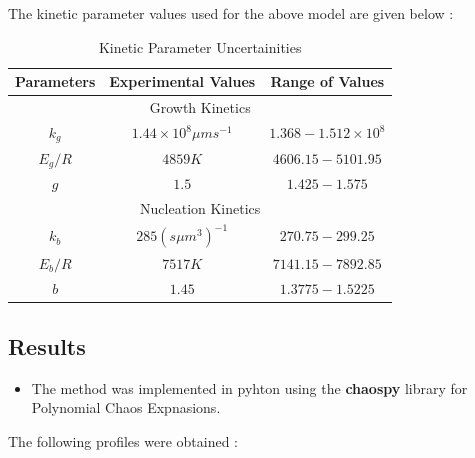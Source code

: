 The kinetic parameter values used for the above model are given below :
\begin{center}
\begin{table}[!h]
\centering
\caption{Kinetic Parameter Uncertainities\cite{hu,shi,paeng}}
\begin{tabular}{|c|c|c|}
\hline
Parameters & Experimental Values & Range of Values\\
\hline
\multicolumn{3}{|c|}{Growth Kinetics} \\
\hline
$k_{g}$ & $1.44\times10^{8} \mu m s^{-1}$ & $1.368 - 1.512\times10^{8} $\\
$E_{g}/R$ & $4859K$ & $4606.15-5101.95$\\
$g$ & $1.5$ & $1.425-1.575$\\
\hline
\multicolumn{3}{|c|}{Nucleation Kinetics} \\
\hline
$k_{b}$ & $285 (s \mu m^{3})^{-1}$ & $270.75-299.25$\\ 
$E_{b}/R$ & $7517K$ & $7141.15-7892.85$\\
$b$ & $1.45$ & $1.3775-1.5225$\\
\hline
\end{tabular}

\label{Table3}
\end{table}
\end{center}



\subsection{Results}

\begin{itemize}
\item The method was implemented in pyhton using the \textbf{chaospy} library\cite{chaospy} for Polynomial Chaos Expnasions. 
\end{itemize}
The following profiles were obtained : 


